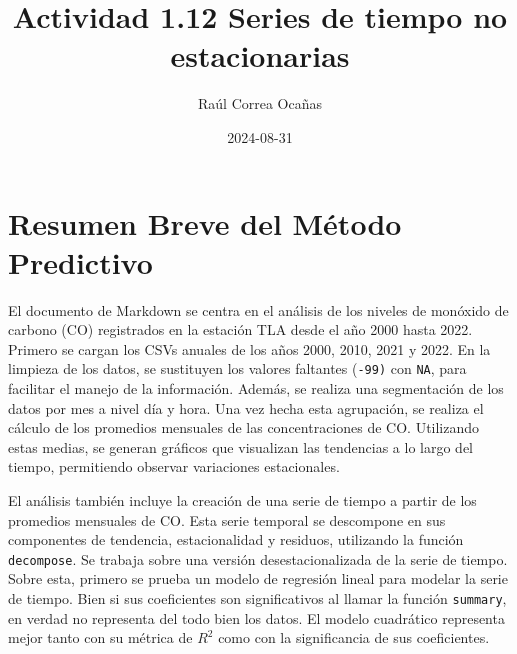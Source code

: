 \documentclass[
]{article}
\title{Actividad 1.12 Series de tiempo no estacionarias}
\author{Raúl Correa Ocañas}
\date{2024-08-31}
\begin{document}
\maketitle

\section{Resumen Breve del Método
Predictivo}\label{resumen-breve-del-muxe9todo-predictivo}

El documento de Markdown se centra en el análisis de los niveles de
monóxido de carbono (CO) registrados en la estación TLA desde el año
2000 hasta 2022. Primero se cargan los CSVs anuales de los años 2000,
2010, 2021 y 2022. En la limpieza de los datos, se sustituyen los
valores faltantes (\texttt{-99)} con \texttt{NA}, para facilitar el
manejo de la información. Además, se realiza una segmentación de los
datos por mes a nivel día y hora. Una vez hecha esta agrupación, se
realiza el cálculo de los promedios mensuales de las concentraciones de
CO. Utilizando estas medias, se generan gráficos que visualizan las
tendencias a lo largo del tiempo, permitiendo observar variaciones
estacionales.

El análisis también incluye la creación de una serie de tiempo a partir
de los promedios mensuales de CO. Esta serie temporal se descompone en
sus componentes de tendencia, estacionalidad y residuos, utilizando la
función \texttt{decompose}. Se trabaja sobre una versión
desestacionalizada de la serie de tiempo. Sobre esta, primero se prueba
un modelo de regresión lineal para modelar la serie de tiempo. Bien si
sus coeficientes son significativos al llamar la función
\texttt{summary}, en verdad no representa del todo bien los datos. El
modelo cuadrático representa mejor tanto con su métrica de \(R^2\) como
con la significancia de sus coeficientes.
\end{document}
